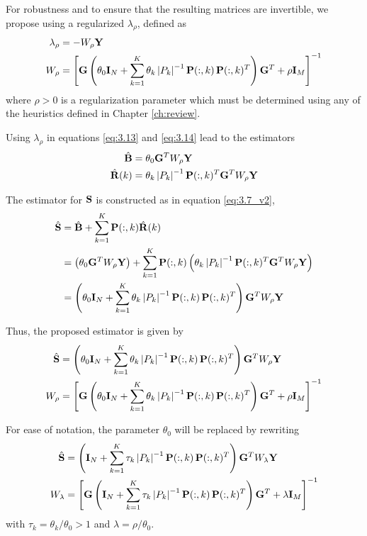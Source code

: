 For robustness and to ensure that the resulting matrices are invertible, we propose using a regularized $\lambda_\rho$, defined as
\begin{align}
    \lambda_\rho &= -W_\rho  \mathbf{Y} 
    \\
    W_\rho &=
    \left[ \mathbf{G} \left(  \theta_0 \mathbf{I}_N + \sum_{k=1}^K \theta_k \left| {P_k} \right|^{-1} 
    \mathbf{P}(:,k)\, \mathbf{P}(:,k)^T
     \right) \mathbf{G}^T + \rho \mathbf{I}_M  \right]^{-1}
\end{align}
where $\rho>0$ is a regularization parameter which must be determined using any of the heuristics defined in Chapter \ref{ch:review}.

Using $\lambda_\rho$ in equations \eqref{eq:3.13} and \eqref{eq:3.14} lead to the estimators
\begin{align}
    \hat{\mathbf{B}} &=
    \theta_0 \mathbf{G}^T W_\rho \mathbf{Y}
    \\
    \hat{\mathbf{R}}(k) &=
    \theta_k \left| {P_k} \right|^{-1} \mathbf{P}(:,k)^T \mathbf{G}^T W_\rho \mathbf{Y}
\end{align}

The estimator for $\mathbf{S}$ is constructed as in equation \eqref{eq:3.7_v2},
\begin{align}
    \hat{\mathbf{S}}
    &=
    \hat{\mathbf{B}} + \sum_{k=1}^K \mathbf{P}(:,k) \hat{\mathbf{R}}(k)
    \nonumber \\
    &=
    \left( \theta_0 \mathbf{G}^T W_\rho \mathbf{Y} \right)
    + \sum_{k=1}^K \mathbf{P}(:,k) \left( \theta_k \left| {P_k} \right|^{-1} \mathbf{P}(:,k)^T \mathbf{G}^T W_\rho \mathbf{Y} \right)
    \nonumber \\
    &=
    \left(  \theta_0 \mathbf{I}_N + \sum_{k=1}^K \theta_k \left| {P_k} \right|^{-1} 
    \mathbf{P}(:,k)\, \mathbf{P}(:,k)^T
     \right) \mathbf{G}^T W_\rho \mathbf{Y}
\end{align}

Thus, the proposed estimator is given by
\begin{align}
    \hat{\mathbf{S}}
    &=
    \left(  \theta_0 \mathbf{I}_N + \sum_{k=1}^K \theta_k \left| {P_k} \right|^{-1} 
    \mathbf{P}(:,k)\, \mathbf{P}(:,k)^T
     \right) \mathbf{G}^T W_\rho \mathbf{Y}
    \\
    W_\rho &=
    \left[ \mathbf{G} \left(  \theta_0 \mathbf{I}_N + \sum_{k=1}^K \theta_k \left| {P_k} \right|^{-1} 
    \mathbf{P}(:,k)\, \mathbf{P}(:,k)^T
     \right) \mathbf{G}^T + \rho \mathbf{I}_M  \right]^{-1}
\end{align}

For ease of notation, the parameter $\theta_0$ will be replaced by rewriting
\begin{align}
    \hat{\mathbf{S}}
    &=
    \left(  \mathbf{I}_N + \sum_{k=1}^K \tau_k \left| {P_k} \right|^{-1} 
    \mathbf{P}(:,k)\, \mathbf{P}(:,k)^T
     \right) \mathbf{G}^T W_\lambda \mathbf{Y}
    \label{eq:3.24}
    \\
    W_\lambda &=
    \left[ \mathbf{G} \left(  \mathbf{I}_N + \sum_{k=1}^K \tau_k \left| {P_k} \right|^{-1} 
    \mathbf{P}(:,k)\, \mathbf{P}(:,k)^T
     \right) \mathbf{G}^T + \lambda \mathbf{I}_M  \right]^{-1}
    \label{eq:3.25}
\end{align}
with $\tau_k = \theta_k/\theta_0 > 1$ and $\lambda=\rho/\theta_0$.

